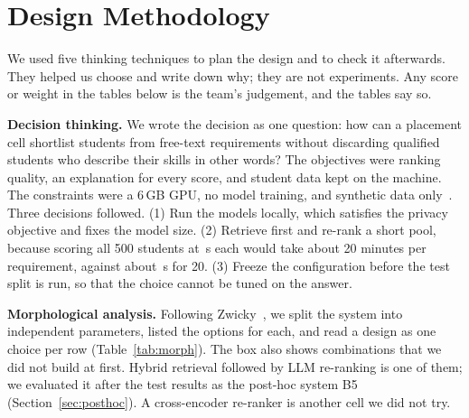 \documentclass[conference]{IEEEtran}
\begin{document}
\section{Design Methodology}\label{sec:method}
We used five thinking techniques to plan the design and to check it afterwards. They helped us choose and write down why; they are not experiments. Any score or weight in the tables below is the team's judgement, and the tables say so.

\textbf{Decision thinking.} We wrote the decision as one question: how can a placement cell shortlist students from free-text requirements without discarding qualified students who describe their skills in other words? The objectives were ranking quality, an explanation for every score, and student data kept on the machine. The constraints were a 6\,GB GPU, no model training, and synthetic data only~\cite{hammond1999smart}. Three decisions followed. (1) Run the models locally, which satisfies the privacy objective and fixes the model size. (2) Retrieve first and re-rank a short pool, because scoring all 500 students at \TimePerCandidate{}\,s each would take about 20 minutes per requirement, against about \TimeRerankPerReq{}\,s for 20. (3) Freeze the configuration before the test split is run, so that the choice cannot be tuned on the answer.

\textbf{Morphological analysis.} Following Zwicky~\cite{zwicky1969discovery}, we split the system into independent parameters, listed the options for each, and read a design as one choice per row (Table~\ref{tab:morph}). The box also shows combinations that we did not build at first. Hybrid retrieval followed by LLM re-ranking is one of them; we evaluated it after the test results as the post-hoc system B5 (Section~\ref{sec:posthoc}). A cross-encoder re-ranker is another cell we did not try.

\begin{table}[!t]
\caption{Morphological box of PlaceIQ. Bold marks the option we built. The baselines B1 to B3b cover the keyword, BM25, dense and hybrid options; the cross-encoder was not evaluated.}
\label{tab:morph}
\centering\footnotesize
{}
\end{table}
\end{document}
